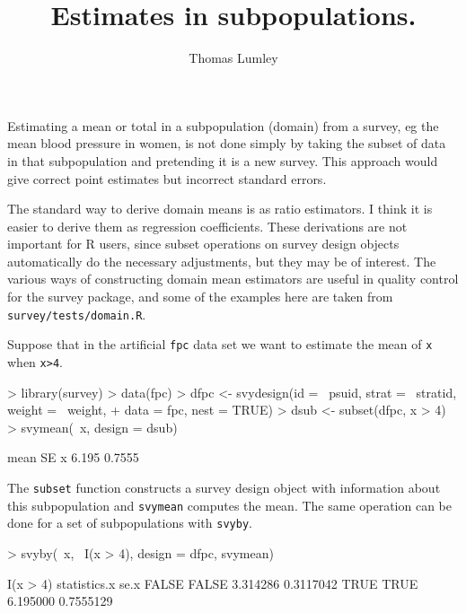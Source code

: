 \documentclass{article}
\author{Thomas Lumley}
\title{Estimates in subpopulations.}
\begin{document}
\maketitle

Estimating a mean or total in a subpopulation (domain) from a survey, eg the
mean blood pressure in women, is not done simply by taking the subset
of data in that subpopulation and pretending it is a new survey.  This
approach would give correct point estimates but incorrect standard
errors.

The standard way to derive domain means is as ratio estimators. I
think it is easier to derive them as regression coefficients.  These
derivations are not important for R users, since subset operations on
survey design objects automatically do the necessary adjustments, but
they may be of interest.  The various ways of constructing domain mean
estimators are useful in quality control for the survey package, and
some of the examples here are taken from
\texttt{survey/tests/domain.R}.


Suppose that in the artificial \texttt{fpc} data set we want to
estimate the mean of \texttt{x} when \texttt{x>4}.
\begin{Schunk}
\begin{Sinput}
> library(survey)
> data(fpc)
> dfpc <- svydesign(id = ~psuid, strat = ~stratid, weight = ~weight, 
+     data = fpc, nest = TRUE)
> dsub <- subset(dfpc, x > 4)
> svymean(~x, design = dsub)
\end{Sinput}
\begin{Soutput}
   mean     SE
x 6.195 0.7555
\end{Soutput}
\end{Schunk}

The \texttt{subset} function constructs a survey design object with
information about this subpopulation and \texttt{svymean} computes the
mean. The same operation can be done for a set of subpopulations with
\texttt{svyby}.
\begin{Schunk}
\begin{Sinput}
> svyby(~x, ~I(x > 4), design = dfpc, svymean)
\end{Sinput}
\begin{Soutput}
      I(x > 4) statistics.x      se.x
FALSE    FALSE     3.314286 0.3117042
TRUE      TRUE     6.195000 0.7555129
\end{Soutput}
\end{Schunk}
\end{document}
